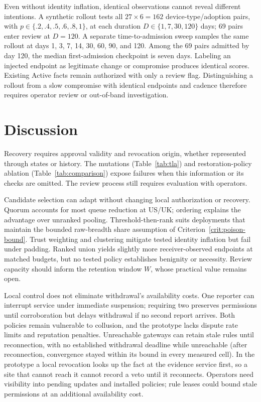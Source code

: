 \documentclass[journal]{IEEEtran}
\theoremstyle{definition}
\begin{document}
Even without identity inflation, identical observations cannot reveal different intentions. A synthetic rollout tests all $27\times6=162$ device-type/adoption pairs, with $p\in\{.2,.4,.5,.6,.8,1\}$, at each duration $D\in\{1,7,30,120\}$ days; 69 pairs enter review at $D=120$. A separate time-to-admission sweep samples the same rollout at days 1, 3, 7, 14, 30, 60, 90, and 120. Among the 69 pairs admitted by day 120, the median first-admission checkpoint is seven days. Labeling an injected endpoint as legitimate change or compromise produces identical scores. Existing Active facts remain authorized with only a review flag. Distinguishing a rollout from a slow compromise with identical endpoints and cadence therefore requires operator review or out-of-band investigation.



\section{Discussion}
\label{sec:discussion}

Recovery requires approval validity and revocation origin, whether represented through states or history. The mutations (Table~\ref{tab:tla}) and restoration-policy ablation (Table~\ref{tab:comparison}) expose failures when this information or its checks are omitted. The review process still requires evaluation with operators.

Candidate selection can adapt without changing local authorization or recovery. Quorum accounts for most queue reduction at US/UK; ordering explains the advantage over unranked pooling. Threshold-then-rank suits deployments that maintain the bounded raw-breadth share assumption of Criterion~\ref{crit:poison-bound}. Trust weighting and clustering mitigate tested identity inflation but fail under padding. Ranked union yields slightly more receiver-observed endpoints at matched budgets, but no tested policy establishes benignity or necessity. Review capacity should inform the retention window $W$, whose practical value remains open.

Local control does not eliminate withdrawal's availability costs. One reporter can interrupt service under immediate suspension; requiring two preserves permissions until corroboration but delays withdrawal if no second report arrives. Both policies remain vulnerable to collusion, and the prototype lacks dispute rate limits and reputation penalties. Unreachable gateways can retain stale rules until reconnection, with no established withdrawal deadline while unreachable (after reconnection, convergence stayed within its bound in every measured cell). In the prototype a local revocation looks up the fact at the evidence service first, so a site that cannot reach it cannot record a veto until it reconnects. Operators need visibility into pending updates and installed policies; rule leases could bound stale permissions at an additional availability cost.
\end{document}
